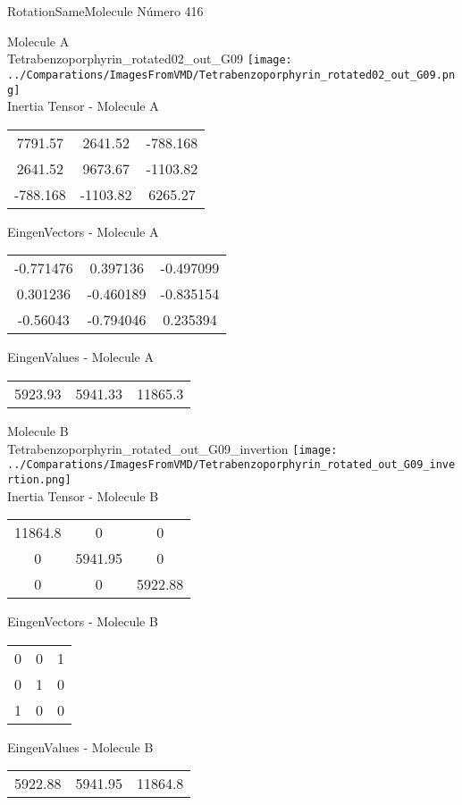 \vtab[-2cm]
\begin{center}
{\large RotationSameMolecule \tab Número 416}
\end{center}
\begin{multicols}{2}
\begin{center}

Molecule A \\ 
Tetrabenzoporphyrin\_rotated02\_out\_G09
\texttt{[image: ../Comparations/ImagesFromVMD/Tetrabenzoporphyrin\_rotated02\_out\_G09.png]}
\\
Inertia Tensor - Molecule A \\
\vtab

\begin{tabular}{|c c c|}
7791.57	 & 	2641.52	 & 	-788.168	 \\
2641.52	 & 	9673.67	 & 	-1103.82	 \\
-788.168	 & 	-1103.82	 & 	6265.27
\end{tabular}

\vtab
 EingenVectors - Molecule A     \\
\vtab
\begin{tabular}{|c c c|}
-0.771476	 & 	0.397136	 & 	-0.497099	 \\
0.301236	 & 	-0.460189	 & 	-0.835154	 \\
-0.56043	 & 	-0.794046	 & 	0.235394
\end{tabular}

\vtab
 EingenValues - Molecule A     \\
\vtab
\begin{tabular}{|c c c|}
5923.93	 & 	5941.33	 & 	11865.3	 \\
\end{tabular}
\columnbreak

Molecule B \\ 
Tetrabenzoporphyrin\_rotated\_out\_G09\_invertion
\texttt{[image: ../Comparations/ImagesFromVMD/Tetrabenzoporphyrin\_rotated\_out\_G09\_invertion.png]}
\\
Inertia Tensor - Molecule B \\
\vtab

\begin{tabular}{|c c c|}
11864.8	 & 	0	 & 	0	 \\
0	 & 	5941.95	 & 	0	 \\
0	 & 	0	 & 	5922.88
\end{tabular}

\vtab
 EingenVectors - Molecule B     \\
\vtab
\begin{tabular}{|c c c|}
0	 & 	0	 & 	1	 \\
0	 & 	1	 & 	0	 \\
1	 & 	0	 & 	0
\end{tabular}

\vtab
 EingenValues - Molecule B     \\
\vtab
\begin{tabular}{|c c c|}
5922.88	 & 	5941.95	 & 	11864.8	 \\
\end{tabular}

\end{center}
\end{multicols}
